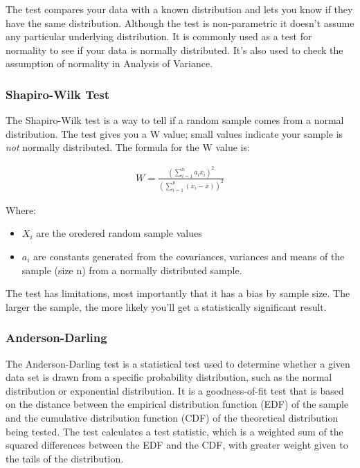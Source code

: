 \documentclass[11pt]{article}
\begin{document}
The test compares your data with a known distribution and lets you know
if they have the same distribution. Although the test is non-parametric
it doesn't assume any particular underlying distribution. It is commonly
used as a test for normality to see if your data is normally
distributed. It's also used to check the assumption of normality in
Analysis of Variance.

\hypertarget{shapiro-wilk-test}{%
\subsubsection{Shapiro-Wilk Test}\label{shapiro-wilk-test}}

The Shapiro-Wilk test is a way to tell if a random sample comes from a
normal distribution. The test gives you a W value; small values indicate
your sample is \emph{not} normally distributed. The formula for the W
value is: 

\begin{gather}
  W=\frac{(\sum_{i=1}^n a_i x_i)^2}{(\sum_{i=1}^n (x_i - \overline{x}))^2}
\end{gather}

Where: 
\begin{itemize}
  \item \(X_i\) are the oredered random sample values
  \item \(a_i\) are constants generated from the covariances, variances and means of the
  sample (size n) from a normally distributed sample.
\end{itemize}

The test has limitations, most importantly that it has a bias by sample
size. The larger the sample, the more likely you'll get a statistically
significant result.

\hypertarget{anderson-darling}{%
\subsubsection{Anderson-Darling}\label{anderson-darling}}

The Anderson-Darling test is a statistical test used to determine
whether a given data set is drawn from a specific probability
distribution, such as the normal distribution or exponential
distribution. It is a goodness-of-fit test that is based on the distance
between the empirical distribution function (EDF) of the sample and the
cumulative distribution function (CDF) of the theoretical distribution
being tested. The test calculates a test statistic, which is a weighted
sum of the squared differences between the EDF and the CDF, with greater
weight given to the tails of the distribution.
\end{document}
